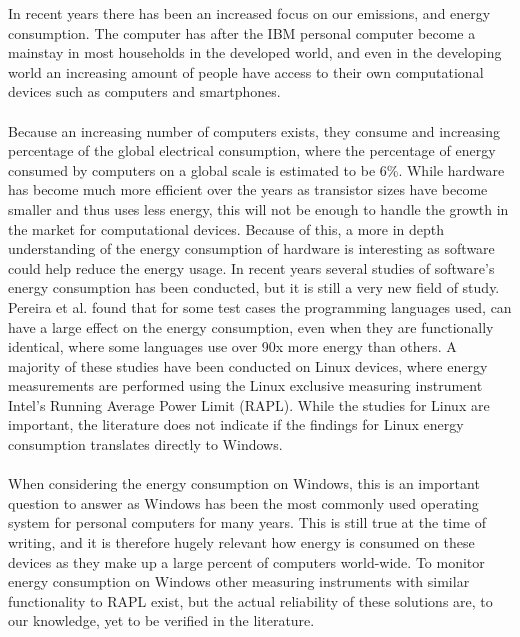 In recent years there has been an increased focus on our emissions, and energy consumption. 
The computer has after the IBM personal computer become a mainstay in most households in the developed world, and even in the developing world an increasing amount of people have access to their own computational devices such as computers and smartphones\cite{DevelopedWorldPC}. 

\paragraph*{}
Because an increasing number of computers exists, they consume and increasing percentage of the global electrical consumption, where the percentage of energy consumed by computers on a global scale is estimated to be 6\%\cite*{somavat2011energy}. While hardware has become much more efficient over the years as transistor sizes have become smaller and thus uses less energy, this will not be enough to handle the growth in the market for computational devices\cite{procaccianti2011profiling}. Because of this, a more in depth understanding of the energy consumption of hardware is interesting as software could help reduce the energy usage\cite{somavat2011energy}. In recent years several studies of software's energy consumption has been conducted, but it is still a very new field of study. Pereira et al.\cite*{Pereira2017} found that for some test cases the programming languages used, can have a large effect on the energy consumption, even when they are functionally identical, where some languages use over 90x more energy than others. A majority of these studies have been conducted on Linux devices, where energy measurements are performed using the Linux exclusive measuring instrument Intel's Running Average Power Limit (RAPL). While the studies for Linux are important, the literature does not indicate if the findings for Linux energy consumption translates directly to Windows\cite{Pereira2017}. 

\paragraph*{}
When considering the energy consumption on Windows, this is an important question to answer as Windows has been the most commonly used operating system for personal computers for many years. This is still true at the time of writing, and it is therefore hugely relevant how energy is consumed on these devices as they make up a large percent of computers world-wide\cite{OSShare}. To monitor energy consumption on Windows other measuring instruments with similar functionality to RAPL exist, but the actual reliability of these solutions are, to our knowledge, yet to be verified in the literature.

